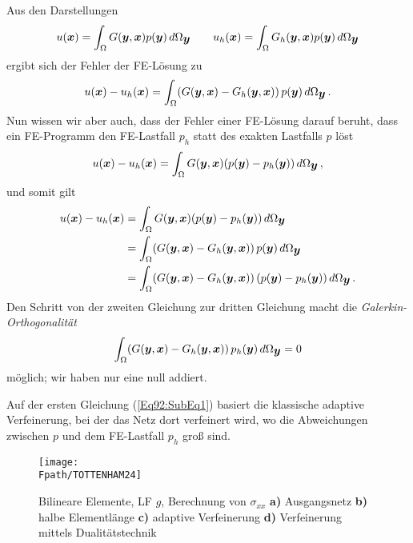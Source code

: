 {Aus den Darstellungen
\begin{align}
u(\mbox{\boldmath $x$})= \int_{\Omega} G(\mbox{\boldmath $y$},\mbox{\boldmath $x$})p(\mbox{\boldmath $y$})\,d\Omega_{\mbox{\boldmath $y$}} \qquad u_h(\mbox{\boldmath $x$})= \int_{\Omega} G_h(\mbox{\boldmath $y$},\mbox{\boldmath $x$})p(\mbox{\boldmath $y$})\,d\Omega_{\mbox{\boldmath $y$}}
\end{align}
ergibt sich der Fehler der FE-L\"{o}sung zu
\begin{align}
u(\mbox{\boldmath $x$}) - u_h(\mbox{\boldmath $x$}) = \int_{\Omega} (G(\mbox{\boldmath $y$},\mbox{\boldmath $x$}) - G_h(\mbox{\boldmath $y$},\mbox{\boldmath $x$}))\,p(\mbox{\boldmath $y$})\,d\Omega_{\mbox{\boldmath $y$}}\,.
\end{align}
Nun wissen wir aber auch, dass der Fehler einer FE-L\"{o}sung darauf beruht, dass ein FE-Programm den FE-Lastfall $p_h$ statt des exakten Lastfalls $p$ l\"{o}st
\begin{align}
u(\mbox{\boldmath $x$}) - u_h(\mbox{\boldmath $x$}) = \int_{\Omega} G(\mbox{\boldmath $y$},\mbox{\boldmath $x$})(p(\mbox{\boldmath $y$}) - p_h(\mbox{\boldmath $y$}))\,d\Omega_{\mbox{\boldmath $y$}}\,,
\end{align}
und somit gilt
\begin{subequations}\label{Eq92}
\begin{align}
u(\mbox{\boldmath $x$}) - u_h(\mbox{\boldmath $x$}) &= \int_{\Omega} G(\mbox{\boldmath $y$},\mbox{\boldmath $x$})(p(\mbox{\boldmath $y$}) - p_h(\mbox{\boldmath $y$}))\,d\Omega_{\mbox{\boldmath $y$}} \label{Eq92:SubEq1} \\
&= \int_{\Omega} (G(\mbox{\boldmath $y$},\mbox{\boldmath $x$}) - G_h(\mbox{\boldmath $y$},\mbox{\boldmath $x$}))\,p(\mbox{\boldmath $y$})\,d\Omega_{\mbox{\boldmath $y$}} \label{Eq92:SubEq2} \\
&= \int_{\Omega} (G(\mbox{\boldmath $y$},\mbox{\boldmath $x$}) - G_h(\mbox{\boldmath $y$},\mbox{\boldmath $x$}))\,(p(\mbox{\boldmath $y$}) - p_h(\mbox{\boldmath $y$}))\,d\Omega_{\mbox{\boldmath $y$}} \label{Eq92:SubEq3}\,.
\end{align}
\end{subequations}
Den Schritt von der zweiten Gleichung zur dritten Gleichung macht die {\em Galerkin-Orthogonalit\"{a}t\/}
\begin{align}
\int_{\Omega} (G(\mbox{\boldmath $y$},\mbox{\boldmath $x$}) - G_h(\mbox{\boldmath $y$},\mbox{\boldmath $x$}))\,p_h(\mbox{\boldmath $y$})\,d\Omega_{\mbox{\boldmath $y$}} = 0
\end{align}
m\"{o}glich; wir haben nur eine null addiert.

Auf der ersten Gleichung (\ref{Eq92:SubEq1}) basiert die klassische adaptive Verfeinerung, bei der das Netz dort verfeinert wird, wo die Abweichungen zwischen $p$ und dem FE-Lastfall $p_h$ gro{\ss} sind.
\begin{figure}[tbp] \centering
\if {} \sidecaption \fi
\texttt{[image: \\Fpath/TOTTENHAM24]}
\caption{Bilineare Elemente, LF $g$, Berechnung von $\sigma_{xx}$ {\bf a)} Ausgangsnetz
{\bf b)} halbe Elementl\"{a}nge {\bf c)} adaptive Verfeinerung {\bf d)} Verfeinerung mittels
Dualit\"{a}tstechnik}\label{Tottenham}
\end{figure}

}
